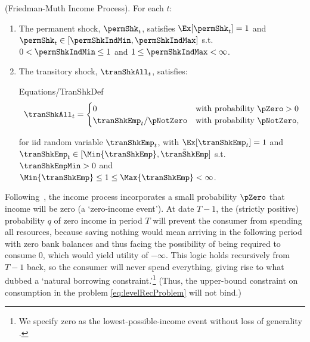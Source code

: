 \documentclass[BufferStockTheory]{subfiles}
\begin{document}
\begin{assumI}\label{ass:shocks}(Friedman-Muth Income Process).
For each $t$:
\begin{enumerate}
\item The permanent shock, $\permShk_{t}$, satisfies $\Ex[{\permShk}_{t}]=1$ and  $\permShk_{t}\in [\permShkIndMin,\permShkIndMax]$ s.t. $0 < \permShkIndMin \leq 1$ and $1 \leq \permShkIndMax < \infty$. 
\item The transitory shock, $\tranShkAll_{t}$, satisfies: 
\begin{verbatimwrite}{Equations/TranShkDef}
  \begin{equation}
    \tranShkAll_{t}=
    \begin{cases}
      0\phantom{_{t+1}/\pNotZero} & \text{with probability $\pZero > 0$} \\
      \tranShkEmp_{t}/\pNotZero      & \text{with probability $\pNotZero  $}, %
    \end{cases} \label{eq:TranShkDef}
  \end{equation}
\end{verbatimwrite}

\noindent for iid random variable $\tranShkEmp_{t}$,  with $\Ex[{\tranShkEmp}_{t}]=1$ and $ \tranShkEmp_{t} \in [\Min{\tranShkEmp}, \bar{\tranShkEmp}]$ s.t.
$\tranShkEmpMin >0$ and $\Min{\tranShkEmp} \leq 1 \leq \Max{\tranShkEmp} < \infty$.

\end{enumerate} 
\end{assumI}

Following~\cite{zeldesStochastic}, the income process incorporates a small probability $\pZero$ that income will be zero (a `zero-income event').
At date $T-1$, the (strictly positive) probability $q$ of zero income in period $T$ will prevent the consumer from spending all resources, because saving nothing would mean arriving in the following period with zero bank balances and thus facing the possibility of being required to consume 0, which would yield utility of $-\infty$.
This logic holds recursively from $T-1$ back, so  the consumer will never spend everything, giving rise to what \cite{aiyagari:ge} dubbed a `natural borrowing constraint.'\footnote{We specify zero as the lowest-possible-income event without loss of generality \citep{aiyagari:ge}.} (Thus, the upper-bound constraint on consumption in the problem \eqref{eq:levelRecProblem} will not bind.)


\hypertarget{PDV}{}
\end{document}
